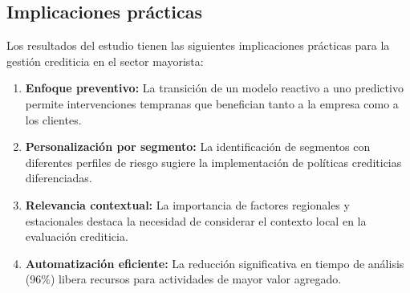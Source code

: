 \subsection{Implicaciones prácticas}
Los resultados del estudio tienen las siguientes implicaciones prácticas para la gestión crediticia en el sector mayorista:

\begin{enumerate}
    \item \textbf{Enfoque preventivo:} La transición de un modelo reactivo a uno predictivo permite intervenciones tempranas que benefician tanto a la empresa como a los clientes.
    
    \item \textbf{Personalización por segmento:} La identificación de segmentos con diferentes perfiles de riesgo sugiere la implementación de políticas crediticias diferenciadas.
    
    \item \textbf{Relevancia contextual:} La importancia de factores regionales y estacionales destaca la necesidad de considerar el contexto local en la evaluación crediticia.
    
    \item \textbf{Automatización eficiente:} La reducción significativa en tiempo de análisis (96\%) libera recursos para actividades de mayor valor agregado.
\end{enumerate}